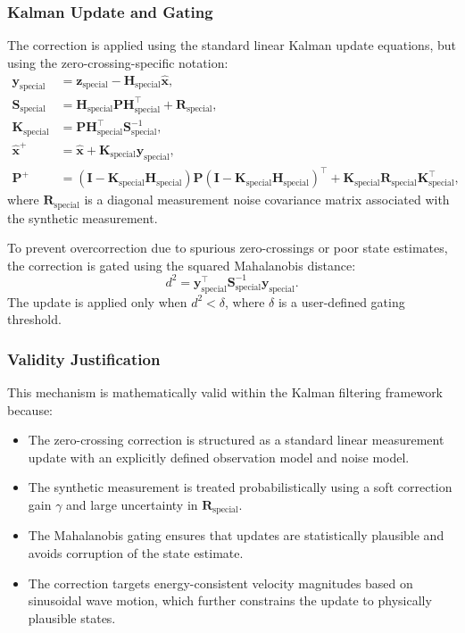 \documentclass[11pt,letterpaper]{article}
\begin{document}
\subsubsection*{Kalman Update and Gating}

The correction is applied using the standard linear Kalman update equations, but using the zero-crossing-specific notation:
\begin{align}
    \bm{y}_\mathrm{special} &= \bm{z}_\mathrm{special} - \bm{H}_\mathrm{special} \bm{\hat{x}}, \\
    \bm{S}_\mathrm{special} &= \bm{H}_\mathrm{special} \bm{P} \bm{H}_\mathrm{special}^\top + \bm{R}_\mathrm{special}, \\
    \bm{K}_\mathrm{special} &= \bm{P} \bm{H}_\mathrm{special}^\top \bm{S}_\mathrm{special}^{-1}, \\
    \bm{\hat{x}}^+ &= \bm{\hat{x}} + \bm{K}_\mathrm{special} \bm{y}_\mathrm{special}, \\
    \bm{P}^+ &= (\bm{I} - \bm{K}_\mathrm{special} \bm{H}_\mathrm{special}) \bm{P} (\bm{I} - \bm{K}_\mathrm{special} \bm{H}_\mathrm{special})^\top + \bm{K}_\mathrm{special} \bm{R}_\mathrm{special} \bm{K}_\mathrm{special}^\top,
\end{align}
where $\bm{R}_\mathrm{special}$ is a diagonal measurement noise covariance matrix associated with the synthetic measurement.

To prevent overcorrection due to spurious zero-crossings or poor state estimates, the correction is gated using the squared Mahalanobis distance:
\begin{equation}
    d^2 = \bm{y}_\mathrm{special}^\top \bm{S}_\mathrm{special}^{-1} \bm{y}_\mathrm{special}.
\end{equation}
The update is applied only when $d^2 < \delta$, where $\delta$ is a user-defined gating threshold.

\subsubsection*{Validity Justification}

This mechanism is mathematically valid within the Kalman filtering framework because:

\begin{itemize}
    \item The zero-crossing correction is structured as a standard linear measurement update with an explicitly defined observation model and noise model.
    \item The synthetic measurement is treated probabilistically using a soft correction gain $\gamma$ and large uncertainty in $\bm{R}_\mathrm{special}$.
    \item The Mahalanobis gating ensures that updates are statistically plausible and avoids corruption of the state estimate.
    \item The correction targets energy-consistent velocity magnitudes based on sinusoidal wave motion, which further constrains the update to physically plausible states.
\end{itemize}
\end{document}
